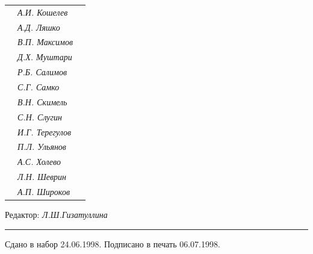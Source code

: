 \begin{tabular}{p{63mm}p{40mm}p{50mm}}
                               &   \it А.И. Кошелев  & \\


                               &   \it А.Д. Ляшко  & \\


                               &   \it В.П. Максимов  & \\


                               &   \it Д.Х. Муштари & \\


                               &   \it Р.Б. Салимов  & \\


                               &   \it С.Г. Самко  & \\


                               &   \it В.Н. Скимель &  \\


                               &   \it С.Н. Слугин  & \\


                               &   \it И.Г. Терегулов  & \\


                               &   \it П.Л. Ульянов  & \\


                               &   \it А.С. Холево  & \\


                               &   \it Л.Н. Шеврин  & \\


                               &   \it А.П. Широков & \\


\end{tabular} 


\bigskip 


\bigskip 


\bigskip 





 


\centerline{Редактор: \it Л.Ш.Гизатуллина}


\bigskip 


\hrule 


\setlength{\hoffset}{-23mm}


\bigskip


\noindent Сдано в набор 24.06.1998. Подписано в печать 06.07.1998.


